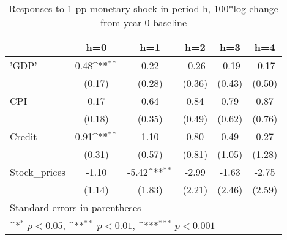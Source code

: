 \begin{table}[htbp]\centering
\def\sym#1{\ifmmode^{#1}\else\(^{#1}\)\fi}
\caption{Responses to 1 pp monetary shock in period h, 100*log change from year 0 baseline}
\begin{tabular}{l*{5}{c}}
\hline\hline
            &\multicolumn{1}{c}{h=0}&\multicolumn{1}{c}{h=1}&\multicolumn{1}{c}{h=2}&\multicolumn{1}{c}{h=3}&\multicolumn{1}{c}{h=4}\\
\hline
'GDP'       &        0.48\sym{**} &        0.22         &       -0.26         &       -0.19         &       -0.17         \\
            &      (0.17)         &      (0.28)         &      (0.36)         &      (0.43)         &      (0.50)         \\
[1em]
CPI         &        0.17         &        0.64         &        0.84         &        0.79         &        0.87         \\
            &      (0.18)         &      (0.35)         &      (0.49)         &      (0.62)         &      (0.76)         \\
[1em]
Credit      &        0.91\sym{**} &        1.10         &        0.80         &        0.49         &        0.27         \\
            &      (0.31)         &      (0.57)         &      (0.81)         &      (1.05)         &      (1.28)         \\
[1em]
Stock\_prices&       -1.10         &       -5.42\sym{**} &       -2.99         &       -1.63         &       -2.75         \\
            &      (1.14)         &      (1.83)         &      (2.21)         &      (2.46)         &      (2.59)         \\
\hline\hline
\multicolumn{6}{l}{\footnotesize Standard errors in parentheses}\\
\multicolumn{6}{l}{\footnotesize \sym{*} \(p<0.05\), \sym{**} \(p<0.01\), \sym{***} \(p<0.001\)}\\
\end{tabular}
\end{table}
